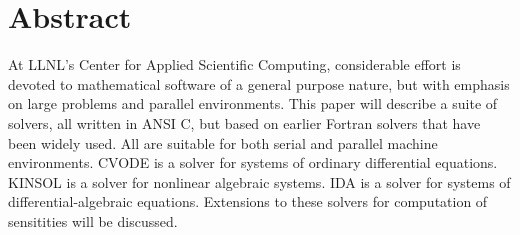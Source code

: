\section*{Abstract}

At LLNL's Center for Applied Scientific Computing, considerable
effort is devoted to mathematical software of a general purpose
nature, but with emphasis on large problems and parallel
environments.  This paper will describe a suite of solvers, all
written in ANSI C, but based on earlier Fortran solvers that have
been widely used.  All are suitable for both serial and parallel
machine environments.  CVODE is a solver for systems of ordinary
differential equations.  KINSOL is a solver for nonlinear
algebraic systems.  IDA is a solver for systems of
differential-algebraic equations.  Extensions to these solvers for
computation of sensitities will be discussed.


